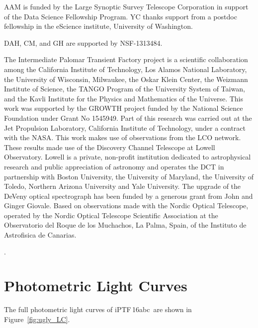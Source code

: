 \documentclass[twocolumn]{aastex61}
\newcommand{\abc}{iPTF\,16abc}
\begin{document}
AAM is funded by the Large Synoptic Survey Telescope Corporation in support of the Data Science Fellowship Program. YC thanks support from a postdoc fellowship in the eScience institute, University of Washington.

DAH, CM, and GH are supported by NSF-1313484.

The Intermediate Palomar Transient Factory project is a scientific collaboration among the California Institute of Technology, Los Alamos National Laboratory, the University of Wisconsin, Milwaukee, the Oskar Klein Center, the Weizmann Institute of Science, the TANGO Program of the University System of Taiwan, and the Kavli Institute for the Physics and Mathematics of the Universe. This work was supported by the GROWTH project funded by the National Science Foundation under Grant No 1545949. Part of this research was carried out at the Jet Propulsion Laboratory, California Institute of Technology, under a contract with the NASA. This work makes use of observations from the LCO network. These results made use of the Discovery Channel Telescope at Lowell Observatory. Lowell is a private, non-profit institution dedicated to astrophysical research and public appreciation of astronomy and operates the DCT in partnership with Boston University, the University of Maryland, the University of Toledo, Northern Arizona University and Yale University.  The upgrade of the DeVeny optical spectrograph has been funded by a generous grant from John and Ginger Giovale. Based on observations made with the Nordic Optical Telescope, operated by the Nordic Optical Telescope Scientific Association at the Observatorio del Roque de los Muchachos, La Palma, Spain, of the Instituto de Astrofisica de Canarias.


.


\appendix

\section{Photometric Light Curves}

The full photometric light curves of \abc\ are shown in Figure~\ref{fig:ugly_LC}.
\end{document}
